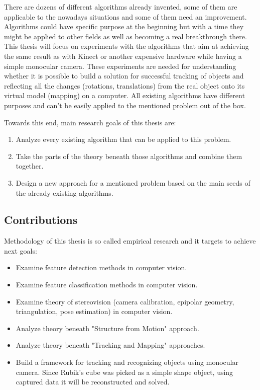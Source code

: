 \documentclass[../main]{subfiles}
\begin{document}
There are dozens of different algorithms already invented, some of them are applicable to the nowadays situations and some of them need an improvement. Algorithms could have specific purpose at the beginning but with a time they might be applied to other fields as well as becoming a real breakthrough there. This thesis will focus on experiments with the algorithms that aim at achieving the same result as with Kinect or another expensive hardware while having a simple monocular camera. These experiments are needed for understanding whether it is possible to build a solution for successful tracking of objects and reflecting all the changes (rotations, translations) from the real object onto its virtual model (mapping) on a computer. All existing algorithms have different purposes and can't be easily applied to the mentioned problem out of the box.

Towards this end, main research goals of this thesis are:
\begin{enumerate}
\item  Analyze every existing algorithm that can be applied to this problem.
\item  Take the parts of the theory beneath those algorithms and combine them together.
\item  Design a new approach for a mentioned problem based on the main seeds of the already existing algorithms. 
\end{enumerate}

\subsection{Contributions}

Methodology of this thesis is so called empirical research and it targets to achieve next goals:

\begin{itemize}
  \item Examine feature detection methods in computer vision.
  \item Examine feature classification methods in computer vision.
  \item Examine theory of stereovision (camera calibration, epipolar geometry, triangulation, pose estimation) in computer vision.
  \item Analyze theory beneath "Structure from Motion" approach.
  \item Analyze theory beneath "Tracking and Mapping" approaches.
  \item Build a framework for tracking and recognizing objects using monocular camera. Since Rubik's cube was picked as a simple shape object, using captured data it will be reconstructed and solved.
\end{itemize}
\end{document}
